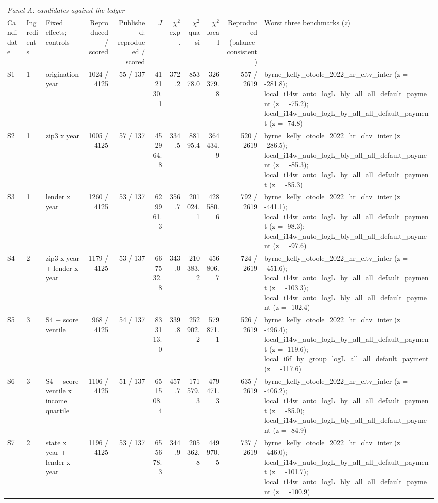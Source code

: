 \begin{tabular}{llp{4.2cm}rrrrrrrp{4.6cm}}
\toprule
\multicolumn{11}{l}{\textit{Panel A: candidates against the ledger}} \\
Candidate & Ingredients & Fixed effects; controls & Reproduced / scored & Published: reproduced / scored & $J$ & $\chi^2$ exp. & $\chi^2$ quasi & $\chi^2$ local & Reproduced (balance-consistent) & Worst three benchmarks ($z$) \\
\midrule
S1 & 1 & origination year & 1024 / 4125 & 55 / 137 & 412130.1 & 372.2 & 85378.0 & 326379.8 & 557 / 2619 & byrne\_kelly\_otoole\_2022\_hr\_cltv\_inter (z = -281.8); local\_i14w\_auto\_logL\_bly\_all\_all\_default\_payment (z = -75.2); local\_i14w\_auto\_logL\_by\_all\_all\_default\_payment (z = -74.8) \\
S2 & 1 & zip3 x year & 1005 / 4125 & 57 / 137 & 452964.8 & 334.5 & 88195.4 & 364434.9 & 520 / 2619 & byrne\_kelly\_otoole\_2022\_hr\_cltv\_inter (z = -286.5); local\_i14w\_auto\_logL\_bly\_all\_all\_default\_payment (z = -85.3); local\_i14w\_auto\_logL\_by\_all\_all\_default\_payment (z = -85.3) \\
S3 & 1 & lender x year & 1260 / 4125 & 53 / 137 & 629961.3 & 356.7 & 201024.1 & 428580.6 & 792 / 2619 & byrne\_kelly\_otoole\_2022\_hr\_cltv\_inter (z = -441.1); local\_i14w\_auto\_logL\_by\_all\_all\_default\_payment (z = -98.3); local\_i14w\_auto\_logL\_bly\_all\_all\_default\_payment (z = -97.6) \\
S4 & 2 & zip3 x year + lender x year & 1179 / 4125 & 53 / 137 & 667532.8 & 343.0 & 210383.2 & 456806.7 & 724 / 2619 & byrne\_kelly\_otoole\_2022\_hr\_cltv\_inter (z = -451.6); local\_i14w\_auto\_logL\_by\_all\_all\_default\_payment (z = -103.3); local\_i14w\_auto\_logL\_bly\_all\_all\_default\_payment (z = -102.4) \\
S5 & 3 & S4 + score ventile & 968 / 4125 & 54 / 137 & 833113.0 & 339.8 & 252902.2 & 579871.1 & 526 / 2619 & byrne\_kelly\_otoole\_2022\_hr\_cltv\_inter (z = -496.4); local\_i14w\_auto\_logL\_by\_all\_all\_default\_payment (z = -119.6); local\_i6f\_by\_group\_logL\_all\_all\_default\_payment (z = -117.6) \\
S6 & 3 & S4 + score ventile x income quartile & 1106 / 4125 & 51 / 137 & 651508.4 & 457.7 & 171579.3 & 479471.3 & 635 / 2619 & byrne\_kelly\_otoole\_2022\_hr\_cltv\_inter (z = -406.2); local\_i14w\_auto\_logL\_by\_all\_all\_default\_payment (z = -85.0); local\_i14w\_auto\_logL\_bly\_all\_all\_default\_payment (z = -84.9) \\
S7 & 2 & state x year + lender x year & 1196 / 4125 & 53 / 137 & 655678.3 & 344.9 & 205362.8 & 449970.5 & 737 / 2619 & byrne\_kelly\_otoole\_2022\_hr\_cltv\_inter (z = -446.0); local\_i14w\_auto\_logL\_by\_all\_all\_default\_payment (z = -101.7); local\_i14w\_auto\_logL\_bly\_all\_all\_default\_payment (z = -100.9) \\

\end{tabular}
